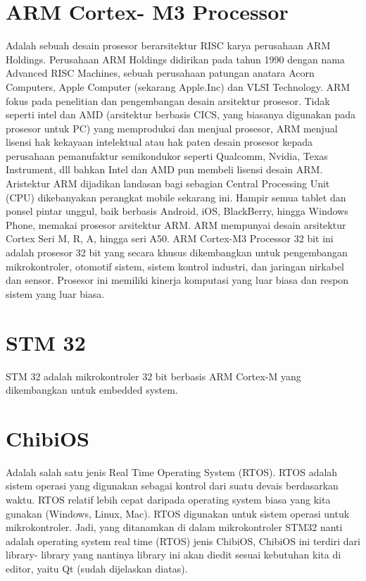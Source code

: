\documentclass[11pt,fleqn]{book} %
\begin{document}
\section{ARM Cortex- M3 Processor}
\hspace{10pt}Adalah sebuah desain prosesor berarsitektur RISC karya perusahaan ARM Holdings. 
Perusahaan ARM Holdings didirikan pada tahun 1990 dengan nama Advanced RISC Machines, 
sebuah perusahaan patungan anatara Acorn Computers, Apple Computer (sekarang Apple.Inc) dan VLSI Technology. 
ARM fokus pada penelitian dan pengembangan desain arsitektur prosesor. 
Tidak seperti intel dan AMD (arsitektur berbasis CICS, yang biasanya digunakan pada prosesor untuk PC) yang memproduksi dan menjual prosesor, 
ARM menjual lisensi hak kekayaan intelektual atau hak paten desain prosesor kepada perusahaan pemanufaktur semikondukor seperti Qualcomm, Nvidia, Texas Instrument, dll 
bahkan Intel dan AMD pun membeli lisensi desain ARM. 
Aristektur ARM dijadikan landasan bagi sebagian Central Processing Unit (CPU) dikebanyakan perangkat mobile sekarang ini. Hampir semua tablet dan ponsel pintar unggul,
baik berbasis Android, iOS, BlackBerry, hingga Windows Phone, memakai prosesor arsitektur ARM. ARM mempunyai desain arsitektur Cortex Seri M, R, A, hingga seri A50. 
ARM Cortex-M3 Processor 32 bit ini adalah prosesor 32 bit yang secara khusus dikembangkan untuk pengembangan mikrokontroler, otomotif sistem, 
sistem kontrol industri, dan jaringan nirkabel dan sensor. Prosesor ini memiliki kinerja komputasi yang luar biasa dan respon sistem yang luar biasa. 
\section{STM 32}
\hspace{10pt}STM 32 adalah mikrokontroler 32 bit berbasis ARM Cortex-M yang dikembangkan untuk embedded system. 
\section{ChibiOS}
\hspace{10pt}Adalah salah satu jenis Real Time Operating System (RTOS). 
RTOS adalah sistem operasi yang digunakan sebagai kontrol dari suatu devais berdasarkan waktu. 
RTOS relatif lebih cepat daripada operating system biasa yang kita gunakan (Windows, Linux, Mac). 
RTOS digunakan untuk sistem operasi untuk mikrokontroler. 
Jadi, yang ditanamkan di dalam mikrokontroler STM32 nanti adalah operating system real time (RTOS) 
jenis ChibiOS, ChibiOS ini terdiri dari library- library yang nantinya library ini akan diedit 
sesuai kebutuhan kita di editor, yaitu Qt (sudah dijelaskan diatas).
\end{document}
